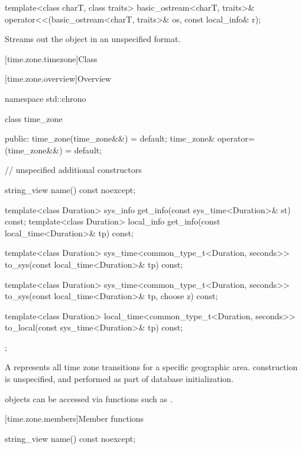 %
\begin{itemdecl}
template<class charT, class traits>
  basic_ostream<charT, traits>&
    operator<<(basic_ostream<charT, traits>& os, const local_info& r);
\end{itemdecl}

\begin{itemdescr}
\pnum
Streams out the  object  in an unspecified format.
\end{itemdescr}

[time.zone.timezone]{Class }

[time.zone.overview]{Overview}

\begin{codeblock}
namespace std::chrono {
  class time_zone {
  public:
    time_zone(time_zone&&) = default;
    time_zone& operator=(time_zone&&) = default;

    // unspecified additional constructors

    string_view name() const noexcept;

    template<class Duration> sys_info   get_info(const sys_time<Duration>& st)   const;
    template<class Duration> local_info get_info(const local_time<Duration>& tp) const;

    template<class Duration>
      sys_time<common_type_t<Duration, seconds>>
        to_sys(const local_time<Duration>& tp) const;

    template<class Duration>
      sys_time<common_type_t<Duration, seconds>>
        to_sys(const local_time<Duration>& tp, choose z) const;

    template<class Duration>
      local_time<common_type_t<Duration, seconds>>
        to_local(const sys_time<Duration>& tp) const;
  };
}
\end{codeblock}

\pnum
A  represents all time zone transitions
for a specific geographic area.
 construction is unspecified,
and performed as part of database initialization.
\begin{note}
 objects can be accessed
via functions such as .
\end{note}

[time.zone.members]{Member functions}

%
\begin{itemdecl}
string_view name() const noexcept;
\end{itemdecl}

